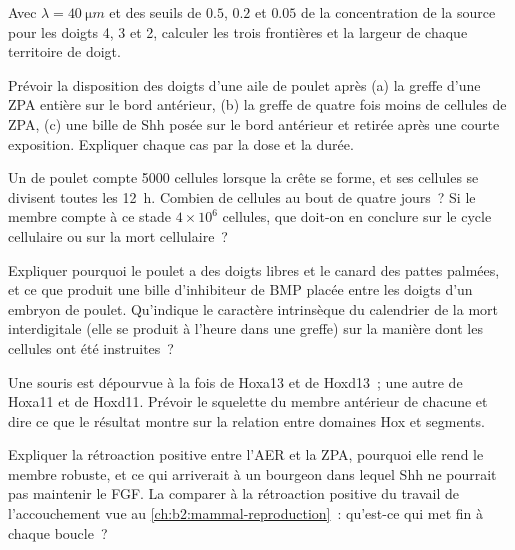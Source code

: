 \begin{exercise}[$\star\star$]\label{exo:b2:limb-organogenesis:5}
Avec $\lambda = \qty{40}{\micro m}$ et des seuils de $0.5$, $0.2$
et $0.05$ de la concentration de la source pour les doigts 4, 3 et 2,
calculer les trois frontières et la largeur de chaque territoire de
doigt.
\end{exercise}

\begin{exercise}[$\star\star$]\label{exo:b2:limb-organogenesis:6}
Prévoir la disposition des doigts d'une aile de poulet après (a) la
greffe d'une ZPA entière sur le bord antérieur, (b) la greffe de quatre
fois moins de cellules de ZPA, (c) une bille de Shh posée sur le bord
antérieur et retirée après une courte exposition. Expliquer chaque cas
par la dose et la durée.
\end{exercise}

\begin{exercise}[$\star\star$]\label{exo:b2:limb-organogenesis:7}
Un  de poulet compte \num{5000} cellules lorsque la
crête se forme, et ses cellules se divisent toutes les \qty{12}{h}.
Combien de cellules au bout de quatre jours~? Si le membre compte à ce
stade $4\times 10^{6}$ cellules, que doit-on en conclure sur le cycle
cellulaire ou sur la mort cellulaire~?
\end{exercise}

\begin{exercise}[$\star\star$]\label{exo:b2:limb-organogenesis:8}
Expliquer pourquoi le poulet a des doigts libres et le canard des pattes
palmées, et ce que produit une bille d'inhibiteur de BMP placée entre
les doigts d'un embryon de poulet. Qu'indique le caractère intrinsèque
du calendrier de la mort interdigitale (elle se produit à l'heure dans
une greffe) sur la manière dont les cellules ont été instruites~?
\end{exercise}

\begin{exercise}[$\star\star$]\label{exo:b2:limb-organogenesis:9}
Une souris est dépourvue à la fois de Hoxa13 et de Hoxd13~; une autre de
Hoxa11 et de Hoxd11. Prévoir le squelette du membre antérieur de chacune
et dire ce que le résultat montre sur la relation entre domaines Hox et
segments.
\end{exercise}

\begin{exercise}[$\star\star\star$]\label{exo:b2:limb-organogenesis:10}
Expliquer la rétroaction positive entre l'AER et la ZPA, pourquoi elle
rend le membre robuste, et ce qui arriverait à un bourgeon dans lequel
Shh ne pourrait pas maintenir le FGF. La comparer à la rétroaction
positive du travail de l'accouchement vue au
\cref{ch:b2:mammal-reproduction}~: qu'est-ce qui met fin à chaque
boucle~?
\end{exercise}

